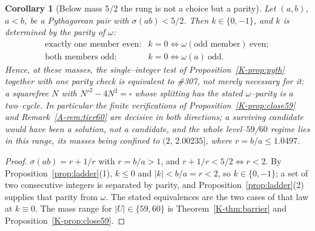 \documentclass[11pt]{article}
\newtheorem{corollary}[theorem]{Corollary}
\theoremstyle{definition}
\begin{document}
\begin{corollary}[Below mass $5/2$ the rung is not a choice but a parity]\label{cor:kdetermined}
Let $(a,b)$, $a<b$, be a Pythagorean pair with $\sigma(ab)<5/2$. Then $k\in\{0,-1\}$, and $k$ is
\emph{determined} by the parity of $\omega$:
\[
\begin{array}{ll}
\text{exactly one member even:} & k=0\iff\omega(\text{odd member})\ \text{even};\\
\text{both members odd:}        & k=0\iff\omega(a)\ \text{odd}.
\end{array}
\]
Hence, at these masses, the single--integer test of Proposition~\ref{K-prop:pyth} together with one
parity check is \emph{equivalent} to \#307, not merely necessary for it: a squarefree $N$ with
$N'^2-4N^2=\square$ whose splitting has the stated $\omega$--parity \emph{is} a two--cycle. In
particular the finite verifications of Proposition~\ref{K-prop:close59} and Remark~\ref{A-rem:tier60} are
decisive in both directions; a surviving candidate would have been a solution, not a candidate,
and the whole level--$59$/$60$ regime lies in this range, its masses being confined to
$(2,\,2.00235]$, where $r=b/a\le1.0497$.
\end{corollary}
\begin{proof}
$\sigma(ab)=r+1/r$ with $r=b/a>1$, and $r+1/r<5/2\iff r<2$. By
Proposition~\ref{prop:ladder}(1), $k\le0$ and $|k|<b/a=r<2$, so $k\in\{0,-1\}$; a set of two
consecutive integers is separated by parity, and Proposition~\ref{prop:ladder}(2) supplies that
parity from $\omega$. The stated equivalences are the two cases of that law at $k\equiv0$. The
mass range for $|U|\in\{59,60\}$ is Theorem~\ref{K-thm:barrier} and Proposition~\ref{K-prop:close59}.
\end{proof}
\end{document}
